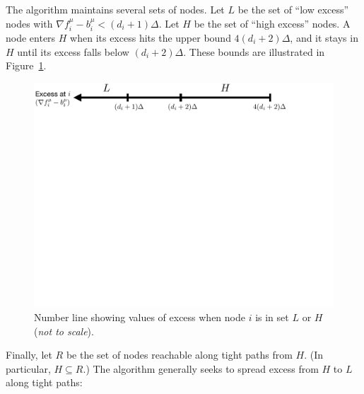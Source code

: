 \documentclass[11pt]{article}
\theoremstyle{definition}
\theoremstyle{definition}
\theoremstyle{definition}
\newcommand{\fu}{f^{\mu}}
\newcommand{\nfiu}{\nabla \fu_i}
\newcommand{\biu}{b_{i}^{\mu}}
\begin{document}
The algorithm maintains several sets of nodes. 
Let $L$ be the set of ``low excess'' nodes with $\nfiu - \biu < (d_i +1)\Delta$.
Let $H$ be the set of ``high excess'' nodes. A node enters $H$ when its excess hits the upper bound
$4(d_i + 2)\Delta$, and it stays in $H$ until its excess falls below $(d_i + 2)\Delta$. 
These bounds are illustrated in Figure~\ref{fig:lh}.
\begin{figure}[h!]
\centering
\includegraphics[width=\textwidth]{figs/lh.pdf}
\caption{
\label{fig:lh}
Number line showing values of excess when node $i$ is in set $L$ or $H$
(\emph{not to scale}).
}
\end{figure}

Finally, let $R$ be the set of nodes reachable along tight paths from $H$. (In particular,
$H \subseteq R$.) The algorithm generally
seeks to spread excess from $H$ to $L$ along tight paths:
\end{document}
